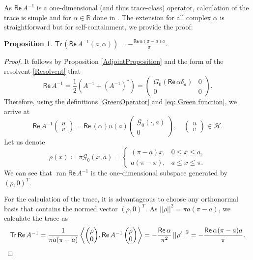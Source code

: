 \documentclass[11pt, a4paper,reqno]{amsart}
\theoremstyle{plain}
\newtheorem{proposition}[theorem]{Proposition}
\theoremstyle{definition}
\theoremstyle{remark}
\newcommand{\inner}[2]{\left\langle{#1}, {#2}\right\rangle}
\newcommand{\norm}[1]{\left|\left|#1\right|\right|}
\newcommand\ran{\mathop\mathrm{ran}\nolimits}
\renewcommand{\leq}{\leqslant}	\renewcommand{\geq}{\geqslant}
\newcommand{\1}{\mathds 1}
\renewcommand{\Re}{\mathsf{Re}\,}
\newcommand{\Tr}{\mathsf{Tr}\,}
\begin{document}
As $\Re A^{-1}$ is a one-dimensional (and thus trace-class) operator, calculation of the trace is simple and for $\alpha \in \mathbb R$ done in \cite{CH}. The extension for all complex $\alpha$ is straightforward but for self-containment, we provide the proof:
\begin{proposition}\label{Trace}
$\Tr\left(\Re A^{-1}(a, \alpha)\right) = - \frac{\Re \alpha(\pi-a)a}{\pi}$.
\end{proposition}
\begin{proof}
    It follows by Proposition \ref{AdjointProposition} and the form of the resolvent \eqref{Resolvent} that
    \[
    \Re A^{-1} = \frac{1}{2}(A^{-1} + (A^{-1})^\ast) = \begin{pmatrix}
        G_0(\Re \alpha \delta_a) & 0 \\
        0 & 0
    \end{pmatrix}.
    \]
    Therefore, using the definitions \eqref{GreenOperator} and \eqref{eq: Green function}, we arrive at
    \[
    \Re A^{-1}\begin{pmatrix}
        u \\ v
    \end{pmatrix} = \Re(\alpha)u(a)\begin{pmatrix}
       \mathcal G_0(\cdot, a) \\ 0
    \end{pmatrix}, \quad \begin{pmatrix}
        u \\ v
    \end{pmatrix} \in \mathcal H.
    \]
    Let us denote
    \[
    \rho(x) \coloneqq \pi \mathcal G_0(x, a) = \begin{cases}
        (\pi - a)x, &0 \leq x \leq a, \\
        a(\pi-x), &a \leq x \leq \pi.
    \end{cases}
    \]
    We can see that $\ran \Re A^{-1}$ is the one-dimensional subspace generated by $(\rho, 0)^T$.

    For the calculation of the trace, it is advantageous to choose any orthonormal basis that contains the normed vector $(\rho, 0)^T$. As $\norm{\rho}^{2} = \pi a(\pi-a)$, we calculate the trace as
    \[
    \Tr \Re A^{-1}  = \frac{1}{\pi a(\pi-a)}\inner{\begin{pmatrix}
    \rho \\ 0 
\end{pmatrix}}{\Re A^{-1}\begin{pmatrix}
    \rho \\ 0 
\end{pmatrix}} = -\frac{\Re \alpha}{\pi^2}\norm{\rho'}^2 = -\frac{\Re \alpha(\pi-a)a}{\pi}. \qedhere
\]
    
\end{proof}
\end{document}
